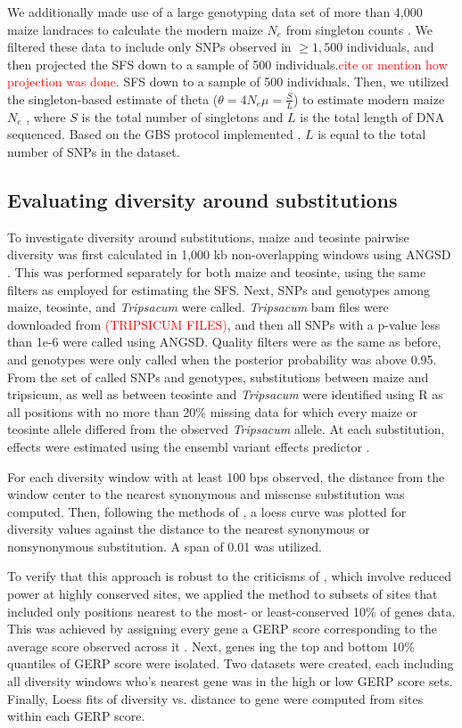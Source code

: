 \documentclass{pnastwo}
\newcommand{\jri}[1]{\textcolor{red}{\scriptsize #1}}
\begin{document}
\begin{article}
\begin{materials}
We additionally made use of a large genotyping data set of more than 4,000 maize landraces \cite{Hearne2015} to calculate the modern maize $N_e$ from singleton counts \cite{fu1993}.
We filtered these data to include only SNPs observed in $\geq 1,500$ individuals, and then projected the SFS down to a sample of 500 individuals.\jri{cite or mention how projection was done}. 
SFS down to a sample of 500 individuals. Then, we utilized the singleton-based estimate of
theta ($\theta = 4N_e\mu = \frac{S}{L}$) to estimate
modern maize $N_e$ \cite{fu1993}, where $S$ is the total number of
singletons and $L$ is the total length of DNA sequenced. Based on the
GBS protocol implemented \cite{elshire2011}, $L$ is equal to the total
number of SNPs in the dataset.

\subsection{Evaluating diversity around substitutions}
To investigate diversity around substitutions, maize and teosinte pairwise diversity was first
calculated in 1,000 kb non-overlapping windows using ANGSD
\cite{korneliussen2014}. This was performed separately for both maize and
teosinte, using the same filters as employed for estimating the
SFS. Next, SNPs and genotypes among maize, teosinte, and \emph{Tripsacum} were called. \emph{Tripsacum} bam files
were downloaded from \textcolor{red}{(TRIPSICUM FILES)}, and then all SNPs with a
p-value less than 1e-6 were called using ANGSD. Quality filters were
as the same as before, and genotypes were only called when the
posterior probability was above 0.95. From the set of called SNPs and
genotypes, substitutions between maize and tripsicum, as well as
between teosinte and \emph{Tripsacum} were identified using R \cite{R2014} as all positions with
no more than 20\% missing data for which every maize or teosinte
allele differed from the observed \emph{Tripsacum} allele. At each
substitution, effects were estimated using the ensembl variant effects
predictor \cite{mclaren2010}.

For each diversity window with at least 100 bps observed, the distance from the window center to the
nearest synonymous and missense substitution was
computed. Then, following the methods of \cite{hernandez2011}, a loess
curve was plotted for diversity values against the distance to the
nearest synonymous or nonsynonymous substitution. A span of 0.01 was
utilized.

To verify that this approach is robust to the criticisms of \cite{enard2014}, which involve reduced power at highly conserved sites, we applied the method to subsets of sites that included only positions nearest to the  most- or least-conserved 10\% of genes data. This was achieved by assigning every gene a GERP score corresponding to the average score observed across it \cite{rodgers2015}. Next, genes ing the top and bottom 10\% quantiles of GERP score were isolated. Two datasets were created, each including all diversity windows who's nearest gene was in the high or low GERP score sets. Finally, Loess fits of diversity vs. distance to gene were computed from sites within each GERP score.




\end{materials}
\end{article}
\end{document}

